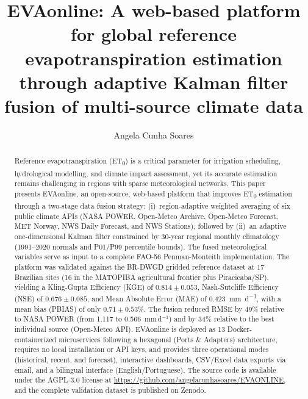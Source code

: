 \documentclass[preprint,review,12pt]{elsarticle}
\begin{document}
\begin{frontmatter}

\title{EVAonline: A web-based platform for global reference evapotranspiration estimation through adaptive Kalman filter fusion of multi-source climate data}

\author[unesp]{Angela Cunha Soares}


\address[unesp]{S\~ao Paulo State University (UNESP), Brazil}

\begin{abstract}
Reference evapotranspiration (ET\textsubscript{0}) is a critical parameter for
irrigation scheduling, hydrological modelling, and climate impact assessment,
yet its accurate estimation remains challenging in regions with sparse
meteorological networks. This paper presents EVAonline, an open-source,
web-based platform that improves ET\textsubscript{0} estimation through a
two-stage data fusion strategy: (i)~region-adaptive weighted averaging of six
public climate APIs (NASA POWER, Open-Meteo Archive, Open-Meteo Forecast, MET
Norway, NWS Daily Forecast, and NWS Stations), followed by (ii)~an adaptive
one-dimensional Kalman filter constrained by 30-year regional monthly
climatology (1991--2020 normals and P01/P99 percentile bounds). The fused
meteorological variables serve as input to a complete FAO-56 Penman-Monteith
implementation. The platform was validated against the BR-DWGD gridded
reference dataset at 17 Brazilian sites (16 in the MATOPIBA agricultural
frontier plus Piracicaba/SP), yielding a Kling-Gupta Efficiency (KGE) of $0.814 \pm
0.053$, Nash-Sutcliffe Efficiency (NSE) of $0.676 \pm 0.085$, and Mean
Absolute Error (MAE) of \SI{0.423}{mm.d^{-1}}, with a mean bias (PBIAS) of
only $0.71 \pm 0.53\%$. The fusion reduced RMSE by 49\% relative to
NASA POWER (from 1.117 to 0.566~mm\,d$^{-1}$) and by 34\% relative to the
best individual source (Open-Meteo API).
EVAonline is deployed as 13 Docker-containerized microservices following a
hexagonal (Ports \& Adapters) architecture, requires no local installation or
API keys, and provides three operational modes (historical, recent, and
forecast), interactive dashboards, CSV/Excel data exports via email, and a
bilingual interface (English/Portuguese). The source code is available under
the AGPL-3.0 license at \url{https://github.com/angelacunhasoares/EVAONLINE},
and the complete validation dataset is published on Zenodo.
\end{abstract}


\end{frontmatter}
\end{document}
